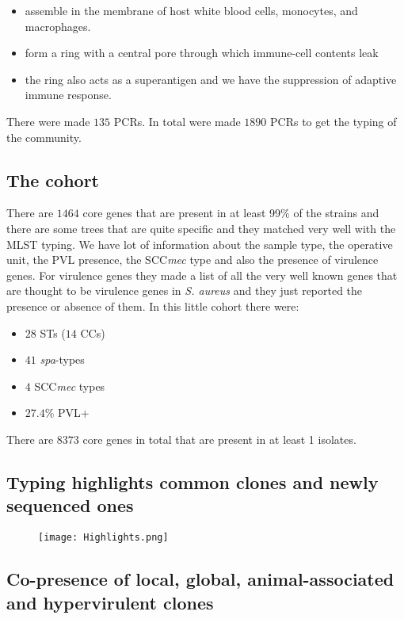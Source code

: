 \begin{itemize}
    \item assemble in the membrane of host white blood cells, monocytes, and macrophages. 
    \item form a ring with a central pore through which immune-cell contents leak
    \item the ring also acts as a superantigen and we have the suppression of adaptive immune response. 
\end{itemize}

There were made $135$ PCRs.
In total were made $1890$ PCRs to get the typing of the community. 

\subsection{The cohort}

There are $1464$ core genes that are present in at least 99$\%$ of the strains and there are some trees that are quite specific and they matched very well with the MLST typing. We have lot of information about the sample type, the operative unit, the PVL presence, the SCC\emph{mec} type and also the presence of virulence genes. For virulence genes they made a list of all the very well known genes that are thought to be virulence genes in \textit{S. aureus} and they just reported the presence or absence of them. In this little cohort there were:

\begin{itemize}
    \item $28$ STs ($14$ CCs)
    \item $41$ \emph{spa}-types
    \item $4$ SCC\emph{mec} types 
    \item $27.4\%$ PVL+
\end{itemize}

There are $8373$ core genes in total that are present in at least 1 isolates.
  
\subsection{Typing highlights common clones and newly sequenced ones}

\begin{figure}[h]
\centering
\texttt{[image: Highlights.png]}
\caption{}
\end{figure}

\subsection{Co-presence of local, global, animal-associated and hypervirulent clones}

